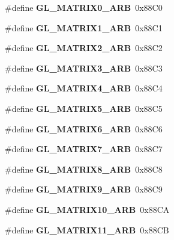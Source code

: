 \begin{DoxyCompactItemize}
\item 
\#define {\bfseries G\+L\+\_\+\+M\+A\+T\+R\+I\+X0\+\_\+\+A\+R\+B}~0x88\+C0\label{_s_d_l__opengl_8h_a6e2e6d77baeb09b9e8bdaa8c6b15b35c}

\item 
\#define {\bfseries G\+L\+\_\+\+M\+A\+T\+R\+I\+X1\+\_\+\+A\+R\+B}~0x88\+C1\label{_s_d_l__opengl_8h_a8ccabb21ca243d3743f10e55b0153aff}

\item 
\#define {\bfseries G\+L\+\_\+\+M\+A\+T\+R\+I\+X2\+\_\+\+A\+R\+B}~0x88\+C2\label{_s_d_l__opengl_8h_aa8cf2da9ddab14be483fe7084b6c3b48}

\item 
\#define {\bfseries G\+L\+\_\+\+M\+A\+T\+R\+I\+X3\+\_\+\+A\+R\+B}~0x88\+C3\label{_s_d_l__opengl_8h_a760b46981594cc2396f6a822326cf412}

\item 
\#define {\bfseries G\+L\+\_\+\+M\+A\+T\+R\+I\+X4\+\_\+\+A\+R\+B}~0x88\+C4\label{_s_d_l__opengl_8h_a2c59139e6da233f8f2ee077c0abc8a92}

\item 
\#define {\bfseries G\+L\+\_\+\+M\+A\+T\+R\+I\+X5\+\_\+\+A\+R\+B}~0x88\+C5\label{_s_d_l__opengl_8h_a4b2aebcc94af17eefb54afa196bfca5c}

\item 
\#define {\bfseries G\+L\+\_\+\+M\+A\+T\+R\+I\+X6\+\_\+\+A\+R\+B}~0x88\+C6\label{_s_d_l__opengl_8h_a8e7627f16215a0b846717d50ac4163bb}

\item 
\#define {\bfseries G\+L\+\_\+\+M\+A\+T\+R\+I\+X7\+\_\+\+A\+R\+B}~0x88\+C7\label{_s_d_l__opengl_8h_a3ac93e85f9b5ce27b9b8139334ecac04}

\item 
\#define {\bfseries G\+L\+\_\+\+M\+A\+T\+R\+I\+X8\+\_\+\+A\+R\+B}~0x88\+C8\label{_s_d_l__opengl_8h_aee46d5f200261d1b9891588bc2823e91}

\item 
\#define {\bfseries G\+L\+\_\+\+M\+A\+T\+R\+I\+X9\+\_\+\+A\+R\+B}~0x88\+C9\label{_s_d_l__opengl_8h_a868c6f96e2f9dfae856a3a9c035e212f}

\item 
\#define {\bfseries G\+L\+\_\+\+M\+A\+T\+R\+I\+X10\+\_\+\+A\+R\+B}~0x88\+C\+A\label{_s_d_l__opengl_8h_a0d959d4ffe6cebd4a8df2e6983b151d6}

\item 
\#define {\bfseries G\+L\+\_\+\+M\+A\+T\+R\+I\+X11\+\_\+\+A\+R\+B}~0x88\+C\+B\label{_s_d_l__opengl_8h_aadfdd559663b98722fdd0ccb754b0590}


\end{DoxyCompactItemize}
